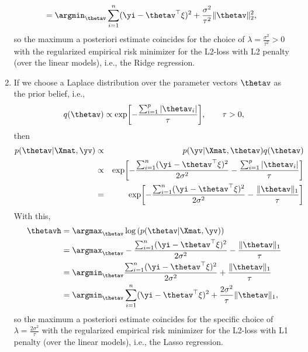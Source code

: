 \begin{enumerate}
\begin{align*}
%  	
  	&= \argmin_{\thetav}   \sum_{i=1}^n (\yi - \thetav^\top \xi)^2  + \frac{\sigma^2}{ \tau^2}  \|\thetav\|_2^2   ,
  \end{align*}
  so the  maximum a posteriori estimate coincides for the choice of $\lambda = \frac{\sigma^2}{ \tau^2}>0$ with the regularized empirical risk minimizer for the L2-loss with L2 penalty (over the linear models), i.e., the Ridge regression.
%  
  \item If we choose a Laplace distribution over the parameter vectors $\thetav$ as the prior belief, i.e.,
%  
	$$  q(\thetav)  \propto  \exp\biggl[-\frac{\sum_{i=1}^p |\thetav_i|}{\tau} \biggr], \qquad \tau>0, $$
	  	then 
%	
	\begin{eqnarray*}
		p(\thetav | \Xmat, \yv) &\propto& p(\yv | \Xmat, \thetav) q(\thetav) \\
		&\propto& \exp\biggl[-\frac{ \sum_{i=1}^n (\yi - \thetav^\top \xi)^2}{2\sigma^2} -\frac{\sum_{i=1}^p |\thetav_i|}{\tau}  \biggr] \\
		&=& \exp\biggl[-\frac{ \sum_{i=1}^n (\yi - \thetav^\top \xi)^2}{2\sigma^2} -\frac{\|\thetav\|_1}{\tau}  \biggr]
	\end{eqnarray*}
	With this, 
	\begin{align*}
		\thetavh 
		&= \argmax_{\thetav} \log \left( p(\thetav | \Xmat, \yv) \right) \\
		&= \argmax_{\thetav} -\frac{ \sum_{i=1}^n (\yi - \thetav^\top \xi)^2}{2\sigma^2} -\frac{\|\thetav\|_1}{\tau}   \\
		&= \argmin_{\thetav}  \frac{ \sum_{i=1}^n (\yi - \thetav^\top \xi)^2}{2\sigma^2} + \frac{\|\thetav\|_1}{\tau}  \\
		&= \argmin_{\thetav}   \sum_{i=1}^n (\yi - \thetav^\top \xi)^2  + \frac{2\sigma^2}{ \tau}  \|\thetav\|_1   ,
	\end{align*}
	so the  maximum a posteriori estimate coincides for the specific choice of $\lambda = \frac{2\sigma^2}{ \tau}$ with the regularized empirical risk minimizer for the L2-loss with L1 penalty (over the linear models), i.e., the Lasso regression.
%	
\end{enumerate}
%
